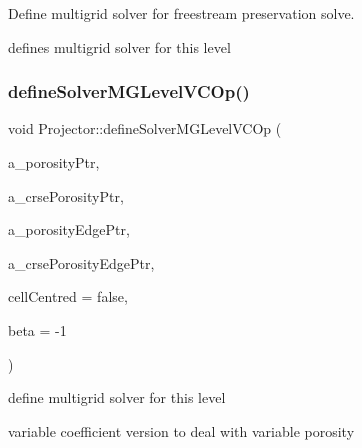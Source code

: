 Define multigrid solver for freestream preservation solve. 

defines multigrid solver for this level \mbox{\label{class_projector_a5640c62724e4682f79997f16012e12f7}} 
\subsubsection{\texorpdfstring{define\+Solver\+M\+G\+Level\+V\+C\+Op()}{defineSolverMGLevelVCOp()}}
{\footnotesize\ttfamily void Projector\+::define\+Solver\+M\+G\+Level\+V\+C\+Op (\begin{DoxyParamCaption}\item[{const \textbf{ Ref\+Counted\+Ptr}$<$ \textbf{ Level\+Data}$<$ \textbf{ F\+Array\+Box} $>$ $>$}]{a\+\_\+porosity\+Ptr,  }\item[{const \textbf{ Ref\+Counted\+Ptr}$<$ \textbf{ Level\+Data}$<$ \textbf{ F\+Array\+Box} $>$ $>$}]{a\+\_\+crse\+Porosity\+Ptr,  }\item[{const \textbf{ Ref\+Counted\+Ptr}$<$ \textbf{ Level\+Data}$<$ \textbf{ Flux\+Box} $>$ $>$}]{a\+\_\+porosity\+Edge\+Ptr,  }\item[{const \textbf{ Ref\+Counted\+Ptr}$<$ \textbf{ Level\+Data}$<$ \textbf{ Flux\+Box} $>$ $>$}]{a\+\_\+crse\+Porosity\+Edge\+Ptr,  }\item[{bool}]{cell\+Centred = {\ttfamily false},  }\item[{\textbf{ Real}}]{beta = {\ttfamily -\/1} }\end{DoxyParamCaption})\hspace{0.3cm}{\ttfamily [protected]}}



define multigrid solver for this level 

variable coefficient version to deal with variable porosity \mbox{\label{class_projector_a09145be377ec504e0412ce78207448fe}} 
